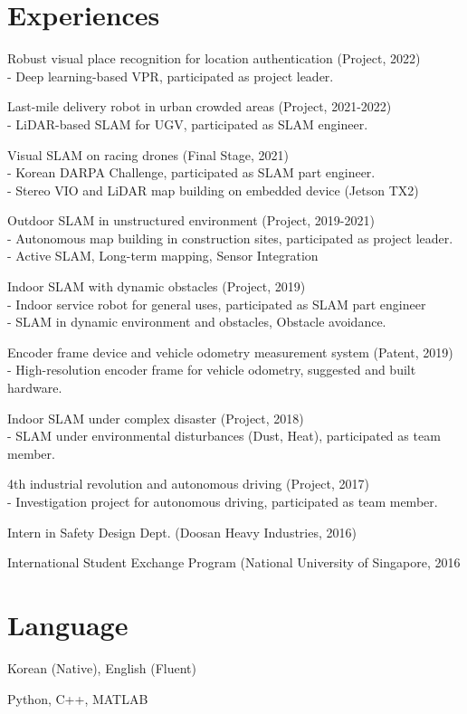 \documentclass[margin]{res}
\begin{document}
\begin{resume}
		\section{Experiences}
		\par	Robust visual place recognition for location authentication (Project, 2022) 
		\\-	Deep learning-based VPR, participated as project leader.
		\par	Last-mile delivery robot in urban crowded areas (Project, 2021-2022) 
		\\-	LiDAR-based SLAM for UGV, participated as SLAM engineer.
		\par	Visual SLAM on racing drones (Final Stage, 2021)
		\\-	Korean DARPA Challenge, participated as SLAM part engineer.
		\\-	Stereo VIO and LiDAR map building on embedded device (Jetson TX2)
		\par	Outdoor SLAM in unstructured environment (Project, 2019-2021)
		\\-	Autonomous map building in construction sites, participated as project leader.
		\\-	Active SLAM, Long-term mapping, Sensor Integration
		\par	Indoor SLAM with dynamic obstacles (Project, 2019)
		\\-	Indoor service robot for general uses, participated as SLAM part engineer
		\\-	SLAM in dynamic environment and obstacles, Obstacle avoidance.
		\par	Encoder frame device and vehicle odometry measurement system (Patent, 2019)
		\\-	High-resolution encoder frame for vehicle odometry, suggested and built hardware.
		\par	Indoor SLAM under complex disaster (Project, 2018)
		\\-	SLAM under environmental disturbances (Dust, Heat), participated as team member.
		\par	4th industrial revolution and autonomous driving (Project, 2017)
		\\-	Investigation project for autonomous driving, participated as team member.
		\par	Intern in Safety Design Dept. (Doosan Heavy Industries, 2016)
		\par	International Student Exchange Program (National University of Singapore, 2016
		
		
		\section{Language}
		\par Korean (Native), English (Fluent)
		\par Python, C++, MATLAB
				
	\end{resume}
\end{document}
